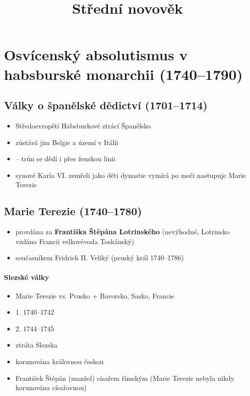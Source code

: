 \title{Střední novověk}


\section{Osvícenský absolutismus v habsburské monarchii (1740--1790)}
\subsection{Války o španělské dědictví (1701--1714)}
\begin{itemize}
\item Středoevropští Habsburkové ztrácí Španělsko
\item zůstává jim Belgie a území v Itálii
\item {} -- trůn se dědí i přes ženskou linii
\item synové Karla VI. zemřeli jako děti \ra dynastie vymírá po meči \ra nastupuje Marie Terezie
\end{itemize}

\subsection{Marie Terezie (1740--1780)}
\begin{itemize}
\item provdána za \textbf{Františka Štěpána Lotrinského} (nevýhodné, Lotrinsko vzdáno Francii \ra velkovévoda Toskánský)
\item současníkem Fridrich II. Veliký (pruský král 1740--1786)
\end{itemize}

\paragraph{Slezské války}
\begin{itemize}
\item Marie Terezie vs. Prusko + Bavorsko, Sasko, Francie
\item 1. 1740--1742
\item 2. 1744--1745
\item ztráta Slezska 
\item korunována královnou českou
\item František Štěpán (manžel) císařem římským (Marie Terezie nebyla nikdy korunována císařovnou)
\end{itemize}

